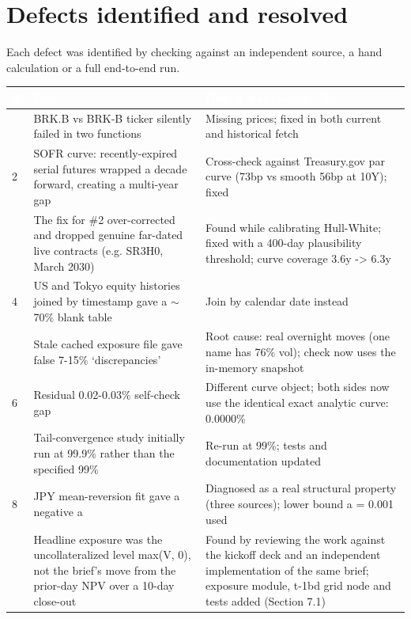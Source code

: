 \documentclass[11pt,letterpaper]{article}
\begin{document}
\section{Defects identified and resolved}
Each defect was identified by checking against an independent source, a hand calculation or a full end-to-end run.

{\scriptsize\setlength{\LTpre}{4pt}\setlength{\LTpost}{6pt}
\begin{longtable}{>{\raggedright\arraybackslash}p{}>{\raggedright\arraybackslash}p{}>{\raggedright\arraybackslash}p{}}
\toprule
\rowcolor{navy}\textbf{\textcolor{white}{\#}} & \textbf{\textcolor{white}{Bug}} & \textbf{\textcolor{white}{How it was caught / fix}} \\
\endhead
1 & BRK.B vs BRK-B ticker silently failed in two functions & Missing prices; fixed in both current and historical fetch \\
\rowcolor{gray!9}2 & SOFR curve: recently-expired serial futures wrapped a decade forward, creating a multi-year gap & Cross-check against Treasury.gov par curve (73bp vs smooth 56bp at 10Y); fixed \\
3 & The fix for \#2 over-corrected and dropped genuine far-dated live contracts (e.g. SR3H0, March 2030) & Found while calibrating Hull-White; fixed with a 400-day plausibility threshold; curve coverage 3.6y -\textgreater{} 6.3y \\
\rowcolor{gray!9}4 & US and Tokyo equity histories joined by timestamp gave a $\sim$70\% blank table & Join by calendar date instead \\
5 & Stale cached exposure file gave false 7-15\% `discrepancies' & Root cause: real overnight moves (one name has 76\% vol); check now uses the in-memory snapshot \\
\rowcolor{gray!9}6 & Residual 0.02-0.03\% self-check gap & Different curve object; both sides now use the identical exact analytic curve: 0.0000\% \\
7 & Tail-convergence study initially run at 99.9\% rather than the specified 99\% & Re-run at 99\%; tests and documentation updated \\
\rowcolor{gray!9}8 & JPY mean-reversion fit gave a negative a & Diagnosed as a real structural property (three sources); lower bound a = 0.001 used \\
9 & Headline exposure was the uncollateralized level max(V, 0), not the brief's move from the prior-day NPV over a 10-day close-out & Found by reviewing the work against the kickoff deck and an independent implementation of the same brief; exposure module, t-1bd grid node and tests added (Section 7.1) \\

\end{longtable}}
\end{document}
